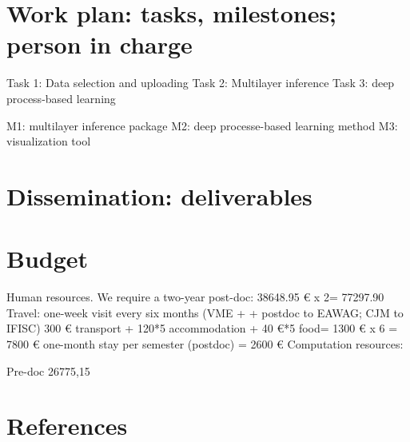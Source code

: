 \documentclass[authoryear,1p,12pt]{elsarticle}
\begin{document}
     
     
     \newpage
     \section{Work plan: tasks, milestones; person in charge}

     Task 1: Data selection and uploading
     Task 2: Multilayer inference
     Task 3: deep process-based learning

     M1: multilayer inference package
     M2: deep processe-based learning method
     M3: visualization tool

     \newpage
     \section{Dissemination: deliverables}
     \newpage
     \section{Budget}
     
     Human resources.
     We require a two-year post-doc: 38648.95 € x 2= 77297.90
     Travel: one-week visit every six months (VME + + postdoc to EAWAG; CJM to IFISC) 300 € transport + 120*5 accommodation + 40 €*5 food= 1300 € x 6 = 7800 €
     one-month stay per semester (postdoc) = 2600 €
     Computation resources: 
     
     Pre-doc 26775,15

     \newpage
     \section{References}


\end{document}
